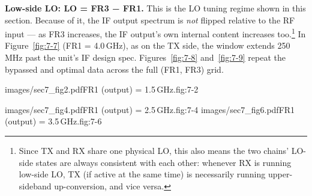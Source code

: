 \textbf{Low-side LO: LO = FR3 − FR1.} This is the LO tuning regime shown in this section. Because of it, the
IF output spectrum is \emph{not} flipped relative to the RF input --- as FR3 increases, the IF output's own
internal content increases too.\footnote{Since TX and RX share one physical LO, this also means the two
chains' LO-side states are always consistent with each other: whenever RX is running low-side LO, TX (if active at the
same time) is necessarily running upper-sideband up-conversion, and vice versa.} In Figure~\ref{fig:7-7} (FR1 = 4.0\,GHz), as on the TX side, the window extends 250\,MHz past the unit's IF design spec. Figures~\ref{fig:7-8} and~\ref{fig:7-9} repeat the bypassed and optimal data across the full (FR1, FR3) grid.

%
        {images/sec7_fig2.pdf}{FR1 (output) = 1.5\,GHz.}{fig:7-2}

%
        {images/sec7_fig4.pdf}{FR1 (output) = 2.5\,GHz.}{fig:7-4}
%
        {images/sec7_fig6.pdf}{FR1 (output) = 3.5\,GHz.}{fig:7-6}

\newpage
{}
